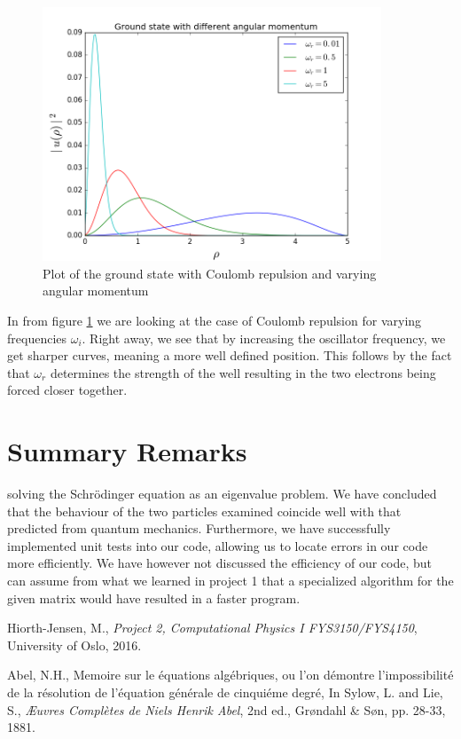 \documentclass[10pt, a4paper]{amsart}
\begin{document}
\begin{figure}[ht]
	\label{fig:Co}
	\centering
	\includegraphics[width=0.9\textwidth]{../figures/omega.png}
	\caption{Plot of the ground state with Coulomb repulsion and varying angular momentum}
\end{figure}

In from figure \ref{fig:Co} we are looking at the case of Coulomb repulsion for varying frequencies $\omega_i$. Right away, we see that by increasing the oscillator frequency, we get sharper curves, meaning a more well defined position. This follows by the fact that $\omega_r$ determines the strength of the well resulting in the two electrons being forced closer together.

\section{Summary Remarks}
solving the Schrödinger equation as an eigenvalue problem. We have concluded that the behaviour of the two particles examined coincide well with that predicted from quantum mechanics. Furthermore, we have successfully implemented unit tests into our code, allowing us to locate errors in our code more efficiently. We have however not discussed the efficiency of our code, but can assume from what we learned in project 1 that a specialized algorithm for the given matrix would have resulted in a faster program. 

\begin{thebibliography}{9}

	Hiorth-Jensen, M.,
	\emph{Project 2, Computational Physics I FYS3150/FYS4150},
	University of Oslo,
	2016.
	
	Abel, N.H.,
	Memoire sur le équations algébriques, ou l'on démontre l'impossibilité de la résolution de l'équation générale de cinquiéme degré,
	In Sylow, L. and Lie, S., 
	\emph{Æuvres Complètes de Niels Henrik Abel}, 2nd ed.,
	Grøndahl \& Søn, pp. 28-33,
	1881.

\end{thebibliography}
\end{document}
